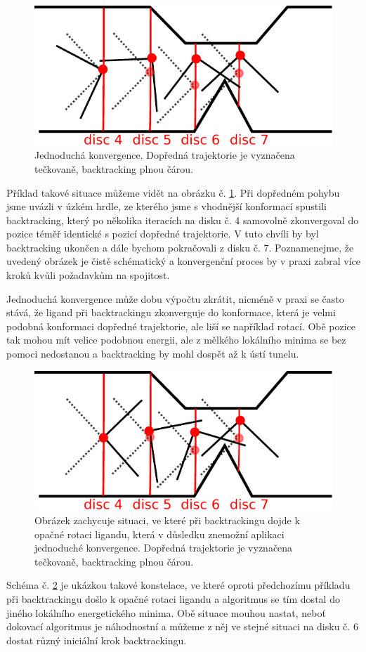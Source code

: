 \begin{figure}[ht]
\centering
\includegraphics[width=.5\hsize]{img/backtracking_simple.pdf}
\caption{Jednoduchá konvergence. Dopředná trajektorie je vyznačena tečkovaně,
backtracking plnou čárou.
}
\label{fig:simple_convergence}
\end{figure}


Příklad takové situace můžeme vidět na obrázku č. \ref{fig:simple_convergence}.
Při dopředném pohybu jsme uvázli v úzkém hrdle, ze kterého jsme s vhodnější
konformací spustili backtracking, který po několika iteracích na disku č. 4
samovolně zkonvergoval do pozice téměř identické s pozicí dopředné trajektorie.
V tuto chvíli by byl backtracking ukončen a dále bychom pokračovali z disku č. 7.
Poznamenejme, že uvedený obrázek je čistě schématický a konvergenční proces
by v praxi zabral více kroků kvůli požadavkům na spojitost.

Jednoduchá konvergence může dobu výpočtu zkrátit, nicméně v praxi se často stává,
že ligand při backtrackingu zkonverguje do konformace, která je velmi podobná
konformaci dopředné trajektorie, ale liší se například rotací. Obě pozice tak
mohou mít velice podobnou energii, ale z mělkého lokálního minima se bez pomoci
nedostanou a backtracking by mohl dospět až k ústí tunelu.

\begin{figure}[ht]
\centering
\includegraphics[width=.5\hsize]{img/backtracking_bad_rotation.pdf}
\caption{Obrázek zachycuje situaci, ve které při backtrackingu dojde k opačné
rotaci ligandu, která v důsledku znemožní aplikaci jednoduché konvergence.
Dopředná trajektorie je vyznačena tečkovaně, backtracking plnou čárou.
}
\label{fig:backtracking_bad}
\end{figure}

Schéma č. \ref{fig:backtracking_bad} je ukázkou takové konstelace, ve které
oproti předchozímu příkladu při backtrackingu došlo k opačné rotaci ligandu
a algoritmus se tím dostal do jiného lokálního energetického minima. Obě situace
mouhou nastat, neboť dokovací algoritmus je náhodnostní a můžeme z něj ve stejné
situaci na disku č. 6 dostat různý iniciální krok backtrackingu.

